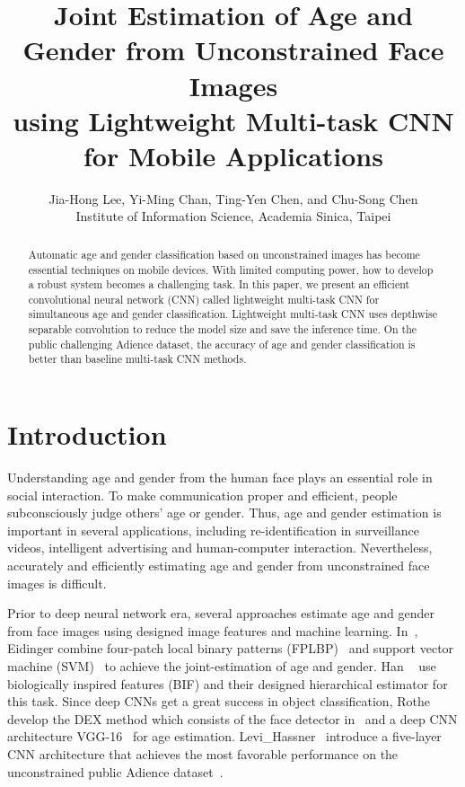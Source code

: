 \documentclass[times, 10pt,twocolumn]{article}
\begin{document}
\title{Joint Estimation of Age and Gender from Unconstrained Face Images \\
using Lightweight Multi-task CNN for Mobile Applications}

\author{Jia-Hong Lee, Yi-Ming Chan, Ting-Yen Chen, and Chu-Song Chen\\
Institute of Information Science, Academia Sinica, Taipei\\

}

\maketitle
\thispagestyle{empty}

\begin{abstract}
Automatic age and gender classification based on unconstrained images has become essential techniques on mobile devices. 
With limited computing power, how to develop a robust system becomes a challenging task.
In this paper, we present an efficient convolutional neural network (CNN) called lightweight multi-task CNN for simultaneous age and gender classification. 
Lightweight multi-task CNN uses depthwise separable convolution to reduce the model size and save the inference time. 
On the public challenging Adience dataset, the accuracy of age and gender classification is better than baseline multi-task CNN methods.

\end{abstract}
\section{Introduction}
Understanding age and gender from the human face plays an essential role in social interaction. 
To make communication proper and efficient, people subconsciously judge others' age or gender.
Thus, age and gender estimation is important in several applications, including re-identification in surveillance videos, intelligent advertising and human-computer interaction. 
Nevertheless, accurately and efficiently estimating age and gender from unconstrained face images is difficult.

Prior to deep neural network era, several approaches estimate age and gender from face images using designed image features and machine learning.
In~\cite{eidinger2014age}, Eidinger \etal combine four-patch local binary patterns (FPLBP)~\cite{wolf2008descriptor} and support vector machine (SVM)~\cite{cortes1995support} to achieve the joint-estimation of age and gender.
Han \etal~\cite{han2015demographic} use biologically inspired features (BIF) and their designed hierarchical estimator for this task.
Since deep CNNs get a great success in object classification, Rothe \etal~\cite{rothe2015dex} develop the DEX method which consists of the face detector in~\cite{mathias2014face} and a deep CNN architecture VGG-16~\cite{simonyan2014very} for age estimation.
Levi\_Hassner~\cite{levi2015age} introduce a five-layer CNN architecture that achieves the most favorable performance on the unconstrained public Adience dataset~\cite{eidinger2014age}.
\end{document}

